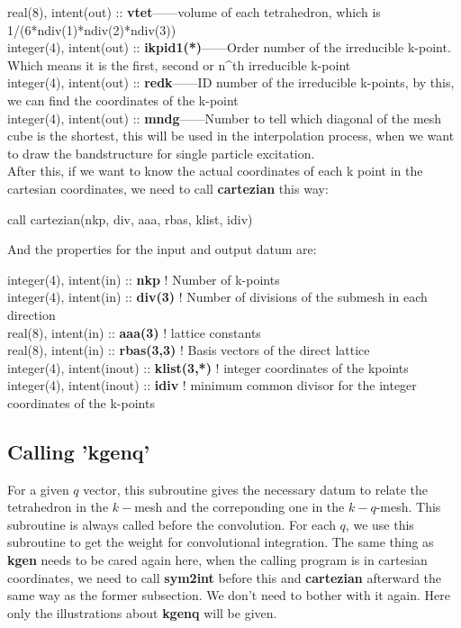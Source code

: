 \documentclass[10pt]{article}
\begin{document}
real(8), intent(out) :: \textbf{vtet}------volume of each tetrahedron, which is 1/(6*ndiv(1)*ndiv(2)*ndiv(3))\\

integer(4), intent(out) :: \textbf{ikpid1(*)}------Order number of the irreducible k-point. Which means it is the first, second or n^{th} irreducible k-point\\
   
integer(4), intent(out) :: \textbf{redk}------ID number of the irreducible k-points, by this, we can find the coordinates of the k-point\\

integer(4), intent(out) :: \textbf{mndg}------Number to tell which diagonal of the mesh cube is the shortest, this will be used in the interpolation process, when we want to draw the bandstructure for single particle excitation.\\

After this, if we want to know the actual coordinates of each k point in the cartesian coordinates, we need to call \textbf{cartezian} this way:

call cartezian(nkp, div, aaa, rbas, klist, idiv)

And the properties for the input and output datum are:

integer(4), intent(in) :: \textbf{nkp}  ! Number of k-points\\

integer(4), intent(in) :: \textbf{div(3)} ! Number of divisions of the submesh in each direction\\

real(8), intent(in) :: \textbf{aaa(3)}  ! lattice constants\\

real(8), intent(in) :: \textbf{rbas(3,3)}  ! Basis vectors of the direct lattice\\

integer(4), intent(inout) :: \textbf{klist(3,*)}  ! integer coordinates of the kpoints\\

integer(4), intent(inout) :: \textbf{idiv}  ! minimum common divisor for the integer coordinates of the k-points\\


\subsection{Calling 'kgenq'}

For a given $q$ vector, this subroutine gives the necessary datum to relate the tetrahedron in the $k-$mesh and the correponding one in the $k-q$-mesh. This subroutine is always called before the convolution. For each $q$, we use this subroutine to get the weight for convolutional integration. The same thing as \textbf{kgen} needs to be cared again here, when the calling program is in cartesian coordinates, we need to call \textbf{sym2int} before this and \textbf{cartezian} afterward the same way as the former subsection. We don't need to bother with it again. Here only the illustrations about \textbf{kgenq} will be given.\\
\end{document}
